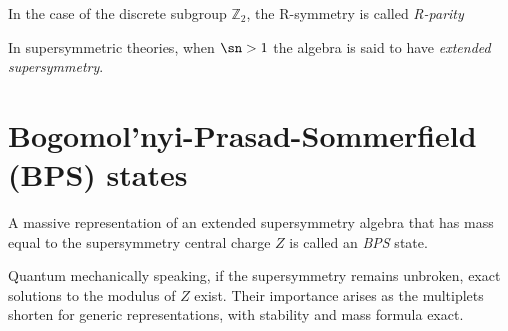 \begin{example}
\begin{remark}
In the case of the discrete subgroup $\mathbb{Z}_2$, the R-symmetry is called \textit{R-parity}
\end{remark}

\begin{definition}
In supersymmetric theories, when $\sn>1$ the algebra is said to have
\textit{extended supersymmetry}.
\end{definition}

\section{Bogomol'nyi-Prasad-Sommerfield (BPS) states}
\begin{definition}
A massive representation of an extended supersymmetry algebra that has mass
equal to the supersymmetry central charge $Z$ is called an \textit{BPS} state.
\end{definition}

Quantum mechanically speaking, if the supersymmetry remains unbroken, exact
solutions to the modulus of $Z$ exist. Their importance arises as the
multiplets shorten for generic representations, with stability and mass formula
exact.


\end{example}
